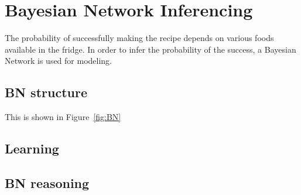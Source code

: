 \section{Bayesian Network Inferencing}
The probability of successfully making the recipe depends on various foods available in the fridge. In order to infer the probability of the success, a Bayesian Network is used for modeling.

\subsection{BN structure}
This is shown in Figure~\ref{fig:BN}
\subsection{Learning}

\subsection{BN reasoning}